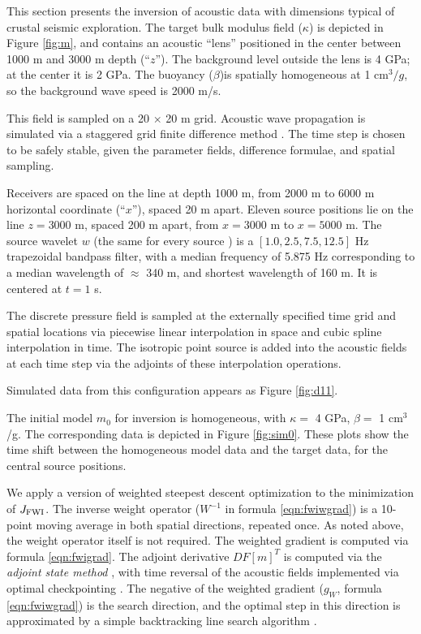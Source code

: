 This section presents the inversion of acoustic data with dimensions
typical of crustal seismic exploration. The target bulk modulus field ($\kappa$)
is depicted in Figure \ref{fig:m}, and contains an acoustic ``lens''
positioned in the center between 1000 m and 3000 m depth
(``$z$''). The background level outside the lens is 4 GPa; at the
center it is 2 GPa. The
buoyancy ($\beta$)is spatially homogeneous at 1 cm$^3/g$, so the background
wave speed is 2000 m/s.


This field is sampled on a 20 $\times$ 20 m grid. Acoustic wave
propagation is simulated via a staggered grid finite difference method
\cite[]{vir86,lev88,Cohen:01}. The time
step is chosen to be safely stable, given the parameter fields,
difference formulae, and
spatial sampling. 

Receivers are spaced on the line at depth 1000 m, from 2000 m to 6000
m horizontal coordinate (``$x$''), spaced 20 m apart. Eleven source
positions lie on the line $z=3000$ m, spaced 200 m apart, from
$x=3000$ m to $x = 5000$ m. The source wavelet $w$ (the same for every
source ) is a $[1.0, 2.5, 7.5, 12.5]$ Hz trapezoidal bandpass filter,
with a median frequency of 5.875 Hz corresponding to a median wavelength of
$\approx$ 340 m, and shortest wavelength of 160 m. It is centered at
$t=1$ s.

The discrete pressure field is
sampled at the externally specified time grid and spatial locations
via piecewise linear interpolation in space and cubic spline
interpolation in time. The isotropic point source is added
into the acoustic fields at each time step via the adjoints of these
interpolation operations.

Simulated data from this configuration appears as Figure \ref{fig:d11}.

The initial model $m_0$ for inversion is homogeneous, with $\kappa = $ 4 GPa,
$\beta = $ 1 cm$^3$/g. The corresponding data is depicted in Figure \ref{fig:sim0}.
These plots show the time shift between the homogeneous model data and
the target data, for the central source positions.


We apply a version of weighted steepest descent optimization to the
minimization of $J_{\rm FWI}$. The inverse weight operator ($W^{-1}$
in formula \ref{eqn:fwiwgrad}) is a
10-point moving average in both spatial directions, repeated once. As
noted above, the weight operator itself is not required. The weighted
gradient is computed via formula \ref{eqn:fwigrad}. The adjoint
derivative $DF[m]^T$ is computed via the {\em adjoint state method}
\cite[]{Chavent:74,GauTarVir:86}, with time reversal of the acoustic fields
implemented via optimal checkpointing
\cite[]{Griewank:92,Griewank:book,Symes:06a-pub}. The negative of the weighted
gradient ($g_W$, formula \ref{eqn:fwiwgrad}) is the search direction,
and the optimal step in this direction is approximated by a simple
backtracking line search algorithm \cite[]{NocedalWright}.

